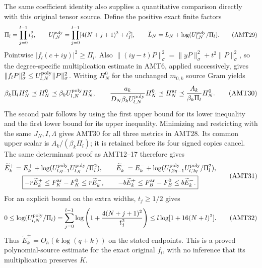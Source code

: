 \documentclass[11pt,a4paper]{article}
\begin{document}
The same coefficient identity also supplies a quantitative comparison
directly with this original tensor source. Define the positive exact
finite factors
\[
 \Pi_l=\prod_{j=0}^{l-1}t_j^2,\qquad
 U_{l,N}^{\rm poly}=\prod_{j=0}^{l-1}[4(N+j+1)^2+t_j^2],\qquad
 \widetilde L_N=L_N+\log(U_{l,N}^{\rm poly}/\Pi_l).
 \tag{AMT29}
\]
Pointwise $|f_l(c+iy)|^2\ge\Pi_l$. Also
$\|(iy-t)P\|_\sigma^2=\|yP\|_\sigma^2+t^2\|P\|_\sigma^2$,
so the degree-specific multiplication estimate in AMT6, applied
successively, gives
$\|f_lP\|_\sigma^2\le U_{l,N}^{\rm poly}\|P\|_\sigma^2$.
Writing $H_N^0$ for the unchanged $m_{0,k}$ source Gram yields
\[
 \beta_k\Pi_lH_N^\sigma\preceq H_N^0
                  \preceq\beta_k U_{l,N}^{\rm poly}H_N^\sigma,
 \qquad
 \frac{a_k}{D_N\beta_k U_{l,N}^{\rm poly}}H_N^0
       \preceq H_N^{\rm ar}\preceq\frac{A_k}{\beta_k\Pi_l}H_N^0.
 \tag{AMT30}
\]
The second pair follows by using the first upper bound for its lower
inequality and the first lower bound for its upper inequality.
Minimizing and restricting with the same $J_N,I,\Lambda$ gives
AMT30 for all three metrics in AMT28. Its common upper scalar is
$A_k/(\beta_k\Pi_l)$; it is retained before its four signed copies
cancel. The same determinant proof as AMT12--17 therefore gives
\[
\begin{gathered}
 \widetilde E_k^+=E_k^+
   +\log(U_{l,q-1}^{\rm poly}U_{l,q}^{\rm poly}/\Pi_l^2),\qquad
 \widetilde E_k^-=E_k^-
   +\log(U_{l,2q-1}^{\rm poly}U_{l,2q}^{\rm poly}/\Pi_l^2),\\
 \boxed{-r\widetilde E_k^+\le F_K^{\rm ar}-F_K^0
                 \le r\widetilde E_k^-,\qquad
        -b\widetilde E_k^+\le F_B^{\rm ar}-F_B^0
                 \le b\widetilde E_k^-.}
\end{gathered}\tag{AMT31}
\]
For an explicit bound on the extra widths, $t_j\ge1/2$ gives
\[
 0\le\log(U_{l,N}^{\rm poly}/\Pi_l)
   =\sum_{j=0}^{l-1}\log\left(1+\frac{4(N+j+1)^2}{t_j^2}\right)
   \le l\log[1+16(N+l)^2].
 \tag{AMT32}
\]
Thus $\widetilde E_k^\pm=O_h(k\log(q+k))$ on the stated endpoints.
This is a proved polynomial-source estimate for the exact original
$f_l$, with no inference that its multiplication preserves $K$.
\end{document}
